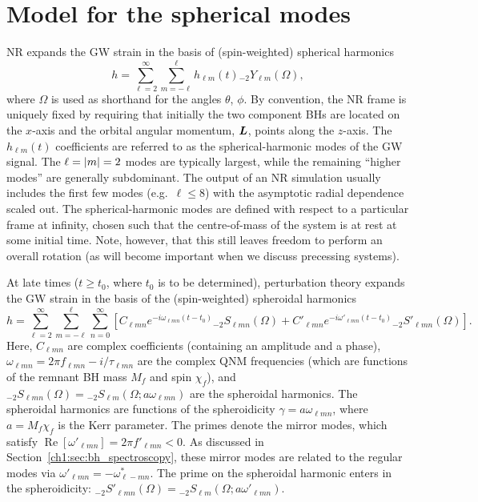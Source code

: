 \section{Model for the spherical modes}
\label{ch2:sec:model}

NR expands the GW strain in the basis of (spin-weighted) spherical harmonics
\begin{equation}\label{ch2:eq:spherical_expansion}
    h = \sum_{\ell = 2}^\infty \sum_{m = -\ell}^\ell h_{\ell m}(t) {}_{-2}Y_{\ell m}(\Omega),
\end{equation}
where $\Omega$ is used as shorthand for the angles $\theta$, $\phi$.
By convention, the NR frame is uniquely fixed by requiring that initially the two component BHs are located on the $x$-axis and the orbital angular momentum, $\vb*{L}$, points along the $z$-axis.
The $h_{\ell m}(t)$ coefficients are referred to as the spherical-harmonic modes of the GW signal.
The $\ell=\abs{m}=2$ modes are typically largest, while the remaining ``higher modes'' are generally subdominant.
The output of an NR simulation usually includes the first few modes (e.g.\ $\ell \leq 8$) with the asymptotic radial dependence scaled out.
The spherical-harmonic modes are defined with respect to a particular frame at infinity, chosen such that the centre-of-mass of the system is at rest at some initial time. 
Note, however, that this still leaves freedom to perform an overall rotation (as will become important when we discuss precessing systems).

At late times ($t \geq t_0$, where $t_0$ is to be determined), perturbation theory expands the GW strain in the basis of the (spin-weighted) spheroidal harmonics
\begin{equation}\label{ch2:eq:spheroidal_expansion}
    h = \sum_{\ell =2}^\infty \sum_{m = -\ell}^\ell \sum_{n = 0}^\infty \left[ C_{\ell m n} e^{-i \omega_{\ell m n} (t - t_0)} {}_{-2}S_{\ell m n}(\Omega) + C'_{\ell m n} e^{-i \omega'_{\ell m n} (t - t_0)} {}_{-2}S'_{\ell m n}(\Omega) \right].
\end{equation}
Here, $C_{\ell m n}$ are complex coefficients (containing an amplitude and a phase), $\omega_{\ell m n} = 2\pi f_{\ell m n} - i/\tau_{\ell m n}$ are the complex QNM frequencies (which are functions of the remnant BH mass $M_f$ and spin $\chi_f$), and ${}_{-2}S_{\ell m n}(\Omega) = {}_{-2}S_{\ell m}(\Omega; a\omega_{\ell m n})$ are the spheroidal harmonics.
The spheroidal harmonics are functions of the spheroidicity $\gamma = a\omega_{\ell m n}$, where $a = M_f \chi_f$ is the Kerr parameter.
The primes denote the mirror modes, which satisfy $\operatorname{Re}[\omega'_{\ell m n}] = 2\pi f'_{\ell m n} < 0$.
As discussed in Section~\ref{ch1:sec:bh_spectroscopy}, these mirror modes are related to the regular modes via $\omega'_{\ell m n} = -\omega^*_{\ell -m n}$.
The prime on the spheroidal harmonic enters in the spheroidicity: ${}_{-2}S'_{\ell m n}(\Omega) = {}_{-2}S_{\ell m}(\Omega; a\omega'_{\ell m n})$.

